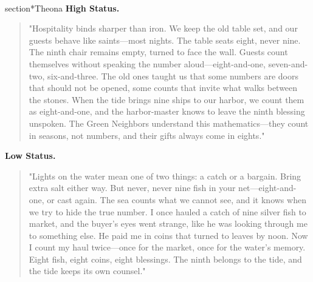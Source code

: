 \\section*{Theona}
\textbf{High Status.}
\begin{quote}
"Hospitality binds sharper than iron. We keep the old table set, and our guests behave like saints—most nights. The table seats eight, never nine. The ninth chair remains empty, turned to face the wall. Guests count themselves without speaking the number aloud—eight-and-one, seven-and-two, six-and-three. The old ones taught us that some numbers are doors that should not be opened, some counts that invite what walks between the stones. When the tide brings nine ships to our harbor, we count them as eight-and-one, and the harbor-master knows to leave the ninth blessing unspoken. The Green Neighbors understand this mathematics—they count in seasons, not numbers, and their gifts always come in eights."
\end{quote}
\textbf{Low Status.}
\begin{quote}
"Lights on the water mean one of two things: a catch or a bargain. Bring extra salt either way. But never, never nine fish in your net—eight-and-one, or cast again. The sea counts what we cannot see, and it knows when we try to hide the true number. I once hauled a catch of nine silver fish to market, and the buyer's eyes went strange, like he was looking through me to something else. He paid me in coins that turned to leaves by noon. Now I count my haul twice—once for the market, once for the water's memory. Eight fish, eight coins, eight blessings. The ninth belongs to the tide, and the tide keeps its own counsel."
\end{quote}


